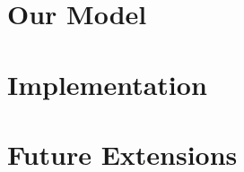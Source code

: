 \documentclass[tog]{acmsiggraph}
\begin{document}
\section{Our Model}


\section{Implementation}


%

\section{Future Extensions} %










\end{document}
